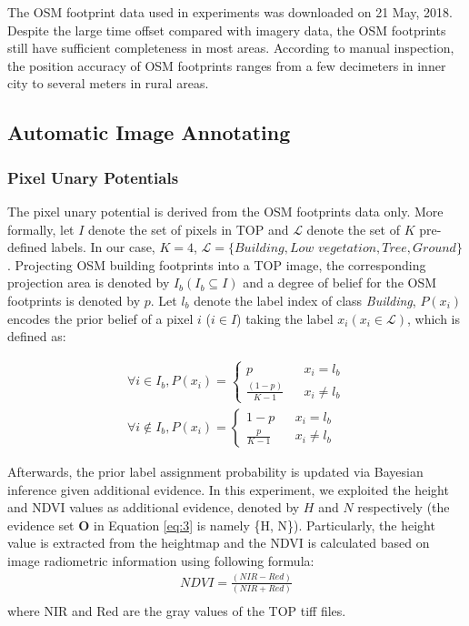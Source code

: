 The OSM footprint data used in experiments was downloaded on 21 May, 2018. Despite the large time offset compared with imagery data, the OSM footprints still have sufficient completeness in most areas. According to manual inspection, the position accuracy of OSM footprints ranges from a few decimeters in inner city to several meters in rural areas.

\subsection{Automatic Image Annotating}
\subsubsection{Pixel Unary Potentials}
The pixel unary potential is derived from the OSM footprints data only. More formally, let $I$ denote the set of pixels in TOP and $\mathcal{L}$ denote the set of $K$ pre-defined labels. In our case, $K=4$, $\mathcal{L}= \big\{\textit{Building}, \textit{Low vegetation}, \textit{Tree}, \textit{Ground}\big\}$. Projecting OSM building footprints into a TOP image, the corresponding projection area is denoted by $I_b\left(I_b \subseteq I\right)$ and a degree of belief for the OSM footprints is denoted by $p$. Let $l_b$ denote the label index of class \textit{Building}, $P\left(x_i\right)$ encodes the prior belief of a pixel $i$ ($i\in I$) taking the label $x_i \left(x_i \in \mathcal{L}\right)$, which is defined as:

\begin{equation}
\label{eq:8}
\begin{aligned}
\forall i\in I_b, P\left(x_i\right)=\left\{
\begin{array}{lcl}
p & & {x_i = l_b}\\
\frac{\left(1-p\right)}{K-1} & & {x_i \neq l_b}
\end{array} \right.
\\
\forall i \notin I_b, P\left(x_i\right)=\left\{
\begin{array}{lcl}
1-p & & {x_i = l_b}\\
\frac{p}{K-1} & & {x_i \neq l_b}
\end{array} \right.
\end{aligned}
\end{equation}

Afterwards, the prior label assignment probability is updated via Bayesian inference given additional evidence. In this experiment, we exploited the height and NDVI values as additional evidence, denoted by $H$ and $N$ respectively (the evidence set $\mathbf{O}$ in Equation \ref{eq:3} is namely \big\{H, N\big\}). Particularly, the height value is extracted from the heightmap and the NDVI is calculated based on image radiometric information using following formula: 
\begin{equation}
\label{eq:9}
\begin{array}{lcl}
NDVI = \frac {(NIR-Red)}{(NIR+Red)}\\
\end{array}
\end{equation}
where NIR and Red are the gray values of the TOP tiff files.

